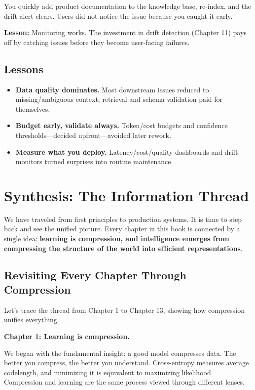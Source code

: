 You quickly add product documentation to the knowledge base, re-index, and the drift alert clears. Users did not notice the issue because you caught it early.

\textbf{Lesson:} Monitoring works. The investment in drift detection (Chapter 11) pays off by catching issues before they become user-facing failures.

\vspace{1em}

\subsection{Lessons}
\begin{itemize}
\item \textbf{Data quality dominates.} Most downstream issues reduced to missing/ambiguous context; retrieval and schema validation paid for themselves.
\item \textbf{Budget early, validate always.} Token/cost budgets and confidence thresholds---decided upfront---avoided later rework.
\item \textbf{Measure what you deploy.} Latency/cost/quality dashboards and drift monitors turned surprises into routine maintenance.
\end{itemize}
\section{Synthesis: The Information Thread}

We have traveled from first principles to production systems. It is time to step back and see the unified picture. Every chapter in this book is connected by a single idea: \textbf{learning is compression, and intelligence emerges from compressing the structure of the world into efficient representations}.

\vspace{1em}


\subsection{Revisiting Every Chapter Through Compression}

Let's trace the thread from Chapter 1 to Chapter 13, showing how compression unifies everything.

\textbf{Chapter 1: Learning is compression.}

We began with the fundamental insight: a good model compresses data. The better you compress, the better you understand. Cross-entropy measures average codelength, and minimizing it is equivalent to maximizing likelihood. Compression and learning are the same process viewed through different lenses.

